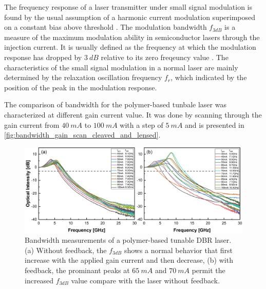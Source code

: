The frequency response of a laser transmitter under small signal modulation is found by the usual assumption of a harmonic current modulation superimposed on a constant bias above threshold \cite{tucker1985high}. The modulation bandwidth $f_{3dB}$ is a measure of the maximum modulation ability in semiconductor lasers through the injection current. It is usually defined as the frequency at which the modulation response has dropped by $3 \ dB$ relative to its zero freqeuncy value \cite{ohtsubo2012semiconductor, agrawal2013semiconductor}. The characteristics of the small signal modulation in a normal laser are mainly determined by the relaxation oscillation frequency $f_r$, which indicated by the position of the peak in the modulation response. 

The comparison of bandwidth for the polymer-based tunbale laser was characterized at different gain current value. It was done by scanning through the gain current from $40 \ mA$ to $100 \ mA$ with a step of $5 \ mA$ and is presented in \autoref{fig:bandwidth_gain_scan_cleaved_and_lensed}. 


\begin{figure}[H]
    \centering
    \includegraphics[width=\linewidth]{figures/bandwidth_gain_scan_cleaved_and_lensed_grating_4679.png}
    \caption{Bandwidth measurements of a polymer-based tunable DBR laser. (a) Without feedback, the $f_{3dB}$ shows a normal behavior that first increase with the applied gain current and then decrease, (b) with feedback, the prominant peaks at $65 \ mA$ and $70 \ mA$ permit the increased $f_{3dB}$ value compare with the laser without feedback.}
    \label{fig:bandwidth_gain_scan_cleaved_and_lensed}
\end{figure}

